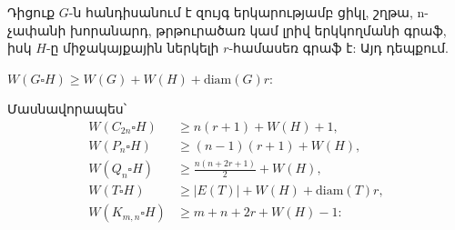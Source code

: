 \begin{corollary}
\label{c2_separable_corollary}
Դիցուք $G$-ն հանդիսանում է զույգ երկարությամբ ցիկլ, շղթա, n-չափանի խորանարդ, թրթուրածառ կամ լրիվ երկկողմանի գրաֆ, իսկ $H$-ը միջակայքային ներկելի $r$-համասեռ գրաֆ է: Այդ դեպքում.
\begin{center}
$W(G \square H) \geq W(G) + W(H) + \mathrm{diam}(G)r$:
\end{center}
Մասնավորապես՝
\begin{align*}
W(C_{2n} \square H) &\geq n(r+1) + W(H) + 1, \\
W(P_{n} \square H) &\geq (n - 1)(r+1) + W(H), \\
W(Q_{n} \square H) &\geq \frac{n(n+2r+1)}{2} + W(H), \\
W(T \square H) &\geq |E(T)| + W(H) + \mathrm{diam}(T)r, \\
W(K_{m,n} \square H) &\geq m+n+2r + W(H) - 1:
\end{align*}
\end{corollary}

